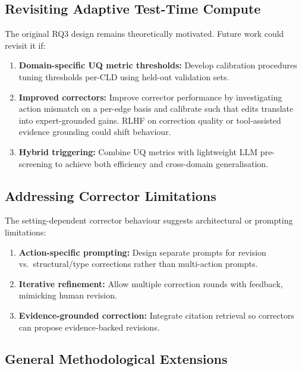 \subsection{Revisiting Adaptive Test-Time Compute}

The original RQ3 design remains theoretically motivated. Future work could revisit it if:
\begin{enumerate}[noitemsep]
    \item \textbf{Domain-specific UQ metric thresholds:} Develop calibration procedures tuning thresholds per-CLD using held-out validation sets.
    \item \textbf{Improved correctors:} Improve corrector performance by investigating action mismatch on a per-edge basis and calibrate such that edits translate into expert-grounded gains. RLHF on correction quality or tool-assisted evidence grounding could shift behaviour.
    \item \textbf{Hybrid triggering:} Combine UQ metrics with lightweight LLM pre-screening to achieve both efficiency and cross-domain generalisation.
\end{enumerate}

\subsection{Addressing Corrector Limitations}

The setting-dependent corrector behaviour suggests architectural or prompting limitations:
\begin{enumerate}[noitemsep]
    \item \textbf{Action-specific prompting:} Design separate prompts for revision vs.\ structural/type corrections rather than multi-action prompts.
    \item \textbf{Iterative refinement:} Allow multiple correction rounds with feedback, mimicking human revision.
    \item \textbf{Evidence-grounded correction:} Integrate citation retrieval so correctors can propose evidence-backed revisions.
\end{enumerate}

\subsection{General Methodological Extensions}


